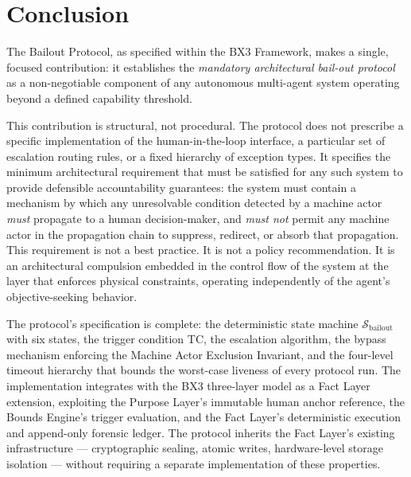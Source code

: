 \section{Conclusion}
\label{sec:conclusion}

The Bailout Protocol, as specified within the BX3 Framework, makes a single, focused contribution: it establishes the \emph{mandatory architectural bail-out protocol} as a non-negotiable component of any autonomous multi-agent system operating beyond a defined capability threshold.

This contribution is structural, not procedural. The protocol does not prescribe a specific implementation of the human-in-the-loop interface, a particular set of escalation routing rules, or a fixed hierarchy of exception types. It specifies the minimum architectural requirement that must be satisfied for any such system to provide defensible accountability guarantees: the system must contain a mechanism by which any unresolvable condition detected by a machine actor \emph{must} propagate to a human decision-maker, and \emph{must not} permit any machine actor in the propagation chain to suppress, redirect, or absorb that propagation. This requirement is not a best practice. It is not a policy recommendation. It is an architectural compulsion embedded in the control flow of the system at the layer that enforces physical constraints, operating independently of the agent's objective-seeking behavior.

The protocol's specification is complete: the deterministic state machine $\mathcal{S}_{\text{bailout}}$ with six states, the trigger condition TC, the escalation algorithm, the bypass mechanism enforcing the Machine Actor Exclusion Invariant, and the four-level timeout hierarchy that bounds the worst-case liveness of every protocol run. The implementation integrates with the BX3 three-layer model as a Fact Layer extension, exploiting the Purpose Layer's immutable human anchor reference, the Bounds Engine's trigger evaluation, and the Fact Layer's deterministic execution and append-only forensic ledger. The protocol inherits the Fact Layer's existing infrastructure — cryptographic sealing, atomic writes, hardware-level storage isolation — without requiring a separate implementation of these properties.

